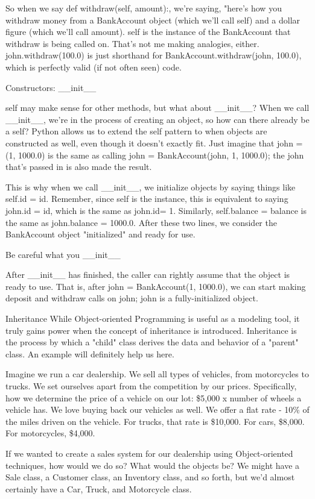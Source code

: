 So when we say def withdraw(self, amount):, we're saying, "here's how you withdraw money from a BankAccount object (which we'll call self) and a dollar figure (which we'll call amount). self is the instance of the BankAccount that  withdraw is being called on. That's not me making analogies, either. john.withdraw(100.0) is just shorthand for BankAccount.withdraw(john, 100.0), which is perfectly valid (if not often seen) code.

Constructors: __init__

self may make sense for other methods, but what about __init__? When we call __init__, we're in the process of creating an object, so how can there already be a self? Python allows us to extend the self pattern to when objects are constructed as well, even though it doesn't exactly fit. Just imagine that john = (1, 1000.0) is the same as calling john = BankAccount(john, 1, 1000.0); the john that's passed in is also made the result.

This is why when we call __init__, we initialize objects by saying things like self.id = id. Remember, since self is the instance, this is equivalent to saying john.id = id, which is the same as john.id= 1. Similarly, self.balance = balance is the same as john.balance = 1000.0. After these two lines, we consider the BankAccount object "initialized" and ready for use.

Be careful what you __init__

After __init__ has finished, the caller can rightly assume that the object is ready to use. That is, after john = BankAccount(1, 1000.0), we can start making deposit and withdraw calls on john; john is a fully-initialized object.

Inheritance
While Object-oriented Programming is useful as a modeling tool, it truly gains power when the concept of inheritance is introduced. Inheritance is the process by which a "child" class derives the data and behavior of a "parent" class. An example will definitely help us here.

Imagine we run a car dealership. We sell all types of vehicles, from motorcycles to trucks. We set ourselves apart from the competition by our prices. Specifically, how we determine the price of a vehicle on our lot: \$5,000 x number of wheels a vehicle has. We love buying back our vehicles as well. We offer a flat rate - 10\% of the miles driven on the vehicle. For trucks, that rate is \$10,000. For cars, \$8,000. For motorcycles, \$4,000.

If we wanted to create a sales system for our dealership using Object-oriented techniques, how would we do so? What would the objects be? We might have a Sale class, a Customer class, an Inventory class, and so forth, but we'd almost certainly have a Car, Truck, and Motorcycle class.

